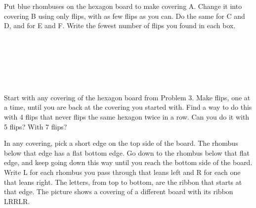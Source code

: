 \documentclass[12pt]{extarticle}
\begin{document}
\vspace{14pt}

\newpage
\prob Put blue rhombuses on the hexagon board to make covering A. Change it into covering B using only flips, with as few flips as you can. Do the same for C and D, and for E and F. Write the fewest number of flips you found in each box.

\vspace{16pt}
\begin{minipage}[t]{4.05in}
\vspace{0pt}
\end{minipage}%
\begin{minipage}[t]{3.45in}
\vspace{0pt}
\centering
{}\hspace{0.07in}\raisebox{0.75in}{\onearrow}\hspace{0.07in}\\[8pt]
\abox\\[22pt]
\hspace{0.07in}\raisebox{0.75in}{\onearrow}\hspace{0.07in}\\[8pt]
\abox\\[22pt]
\hspace{0.07in}\raisebox{0.75in}{\onearrow}\hspace{0.07in}\\[8pt]
\abox
\end{minipage}

\newpage
\prob Start with any covering of the hexagon board from Problem 3. Make flips, one at a time, until you are back at the covering you started with. Find a way to do this with 4 flips that never flips the same hexagon twice in a row. Can you do it with 5 flips? With 7 flips?

\vspace{2pt}

\vspace{16pt}
\prob In any covering, pick a short edge on the top side of the board. The rhombus below that edge has a flat bottom edge. Go down to the rhombus below that flat edge, and keep going down this way until you reach the bottom side of the board. Write L for each rhombus you pass through that leans left and R for each one that leans right. The letters, from top to bottom, are the ribbon that starts at that edge. The picture shows a covering of a different board with its ribbon LRRLR.
\end{document}
